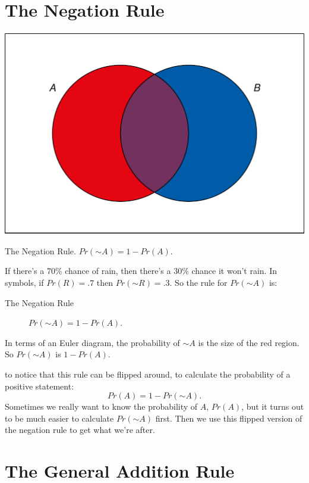 \documentclass[justified]{tufte-book}
\renewcommand{\neg}{\mathbin{\sim}}
\newcommand{\p}{Pr}
\theoremstyle{definition}
\theoremstyle{definition}
\theoremstyle{definition}
\theoremstyle{remark}
\begin{document}
\hypertarget{the-negation-rule}{%
\section{The Negation Rule}\label{the-negation-rule}}

\begin{marginfigure}
\includegraphics{_main_files/figure-latex/unnamed-chunk-68-1} \caption[The Negation Rule]{The Negation Rule. $\p(\neg A) = 1 - \p(A)$.}\label{fig:unnamed-chunk-68}
\end{marginfigure}

If there's a 70\% chance of rain, then there's a 30\% chance it won't
rain. In symbols, if \(\p(R) = .7\) then \(\p(\neg R) = .3\). So the
rule for \(\p(\neg A)\) is:

\begin{description}
\item[The Negation Rule]
\(\p(\neg A) = 1 - \p(A)\).
\end{description}

In terms of an Euler diagram, the probability of \(\neg A\) is the size
of the red region. So \(\p(\neg A)\) is \(1 - \p(A)\).

 to notice that this rule can be flipped
around, to calculate the probability of a positive statement: \[ 
  \p(A) = 1 - \p(\neg A).
\] Sometimes we really want to know the probability of \(A\), \(\p(A)\),
but it turns out to be much easier to calculate \(\p(\neg A)\) first.
Then we use this flipped version of the negation rule to get what we're
after.

\hypertarget{the-general-addition-rule}{%
\section{The General Addition Rule}\label{the-general-addition-rule}}
\end{document}
